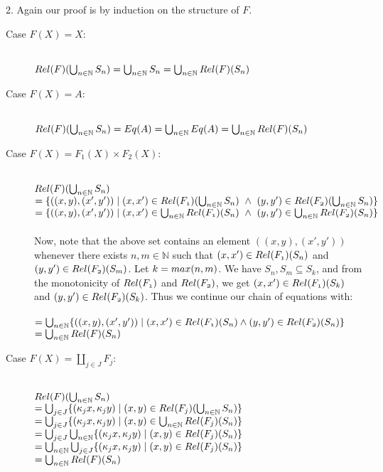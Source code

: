 \documentclass{article}
\begin{document}
2. Again our proof is by induction on the structure of $F$.

\begin{description}
\item[Case $F(X) = X$:]~\\
$\mit{Rel}(F)(\bigcup_{n \in \mathbb N} S_n) = \bigcup_{n \in \mathbb N} S_n = \bigcup_{n \in \mathbb N} \mit{Rel}(F)(S_n)$

\item[Case $F(X) = A$:]~\\
$\mit{Rel}(F)(\bigcup_{n \in \mathbb N} S_n) = \mit{Eq}(A) = \bigcup_{n \in \mathbb N} \mit{Eq}(A) = \bigcup_{n \in \mathbb N} \mit{Rel}(F)(S_n)$

\item[Case $F(X) = F_1(X) \times F_2(X)$:]~\\
$\mit{Rel}(F)(\bigcup_{n \in \mathbb N} S_n)$\\
$= \{ ((x,y),(x',y')) \mid (x,x') \in \mit{Rel}(F_1)(\bigcup_{n \in \mathbb N} S_n)~\wedge~(y,y') \in \mit{Rel}(F_2)(\bigcup_{n \in \mathbb N} S_n) \}$\\
$= \{ ((x,y),(x',y')) \mid (x,x') \in \bigcup_{n \in \mathbb N} \mit{Rel}(F_1)(S_n)~\wedge~(y,y') \in \bigcup_{n \in \mathbb N} \mit{Rel}(F_2)(S_n) \}$\\~\\
Now, note that the above set contains an element $((x,y),(x',y'))$ whenever there exists $n,m \in \mathbb N$
such that $(x,x') \in \mit{Rel}(F_1)(S_n)$ and $(y,y') \in \mit{Rel}(F_2)(S_m)$. Let $k = \mit{max}(n,m)$.
We have $S_n,S_m \subseteq S_k$, and from the monotonicity of $\mit{Rel}(F_1)$ and $\mit{Rel}(F_2)$, 
we get $(x,x') \in \mit{Rel}(F_1)(S_k)$ and $(y,y') \in \mit{Rel}(F_2)(S_k)$. Thus we continue our chain of equations with:\\~\\
$= \bigcup_{n \in \mathbb N} \{ ((x,y),(x',y')) \mid (x,x') \in \mit{Rel}(F_1)(S_n) \wedge (y,y') \in \mit{Rel}(F_2)(S_n) \}$\\
$= \bigcup_{n \in \mathbb N} \mit{Rel}(F)(S_n)$

\item[Case $F(X) = \coprod_{j \in J} F_j$:]~\\
$\mit{Rel}(F)(\bigcup_{n \in \mathbb N} S_n)$\\
$= \bigcup_{j \in J} \{ (\kappa_j x, \kappa_j y) \mid (x,y) \in \mit{Rel}(F_j)(\bigcup_{n \in \mathbb N} S_n) \}$\\
$= \bigcup_{j \in J} \{ (\kappa_j x, \kappa_j y) \mid (x,y) \in \bigcup_{n \in \mathbb N} \mit{Rel}(F_j)(S_n) \}$\\
$= \bigcup_{j \in J} \bigcup_{n \in \mathbb N} \{ (\kappa_j x, \kappa_j y) \mid (x,y) \in \mit{Rel}(F_j)(S_n) \}$\\
$= \bigcup_{n \in \mathbb N} \bigcup_{j \in J} \{ (\kappa_j x, \kappa_j y) \mid (x,y) \in \mit{Rel}(F_j)(S_n) \}$\\
$= \bigcup_{n \in \mathbb N} \mit{Rel}(F)(S_n)$\\
\end{description}
\end{document}
